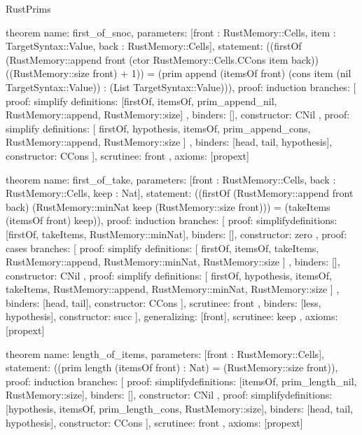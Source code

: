 \begin{lexlean}{RustPrims}
\begin{semanticmodule}
theorem{
  name: first_of_snoc,
  parameters: [front : RustMemory::Cells, item : TargetSyntax::Value, back : RustMemory::Cells],
  statement: ((firstOf (RustMemory::append front (ctor RustMemory::Cells.CCons item back)) ((RustMemory::size front) + 1)) = (prim append (itemsOf front) (cons item (nil TargetSyntax::Value)) : (List TargetSyntax::Value))),
  proof: induction{
    branches: [
      {
        proof: simplify{
          definitions: [firstOf, itemsOf, prim_append_nil, RustMemory::append, RustMemory::size]
        },
        binders: [],
        constructor: CNil
      },
      {
        proof: simplify{
          definitions: [
            firstOf,
            hypothesis,
            itemsOf,
            prim_append_cons,
            RustMemory::append,
            RustMemory::size
          ]
        },
        binders: [head, tail, hypothesis],
        constructor: CCons
      }
    ],
    scrutinee: front
  },
  axioms: [propext]
}

theorem{
  name: first_of_take,
  parameters: [front : RustMemory::Cells, back : RustMemory::Cells, keep : Nat],
  statement: ((firstOf (RustMemory::append front back) (RustMemory::minNat keep (RustMemory::size front))) = (takeItems (itemsOf front) keep)),
  proof: induction{
    branches: [
      {
        proof: simplify{definitions: [firstOf, takeItems, RustMemory::minNat]},
        binders: [],
        constructor: zero
      },
      {
        proof: cases{
          branches: [
            {
              proof: simplify{
                definitions: [
                  firstOf,
                  itemsOf,
                  takeItems,
                  RustMemory::append,
                  RustMemory::minNat,
                  RustMemory::size
                ]
              },
              binders: [],
              constructor: CNil
            },
            {
              proof: simplify{
                definitions: [
                  firstOf,
                  hypothesis,
                  itemsOf,
                  takeItems,
                  RustMemory::append,
                  RustMemory::minNat,
                  RustMemory::size
                ]
              },
              binders: [head, tail],
              constructor: CCons
            }
          ],
          scrutinee: front
        },
        binders: [less, hypothesis],
        constructor: succ
      }
    ],
    generalizing: [front],
    scrutinee: keep
  },
  axioms: [propext]
}

theorem{
  name: length_of_items,
  parameters: [front : RustMemory::Cells],
  statement: ((prim length (itemsOf front) : Nat) = (RustMemory::size front)),
  proof: induction{
    branches: [
      {
        proof: simplify{definitions: [itemsOf, prim_length_nil, RustMemory::size]},
        binders: [],
        constructor: CNil
      },
      {
        proof: simplify{definitions: [hypothesis, itemsOf, prim_length_cons, RustMemory::size]},
        binders: [head, tail, hypothesis],
        constructor: CCons
      }
    ],
    scrutinee: front
  },
  axioms: [propext]
}


\end{semanticmodule}
\end{lexlean}
